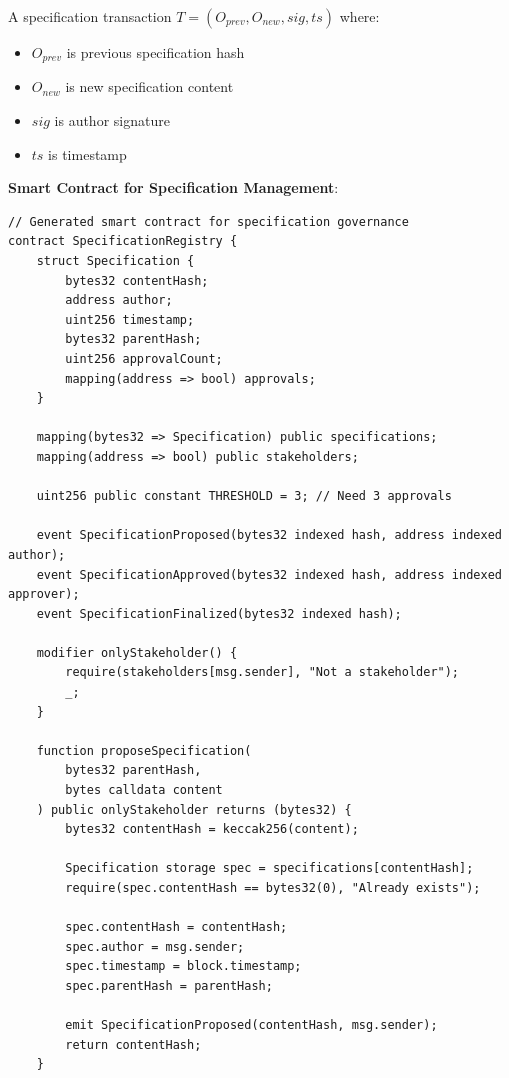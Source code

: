 \begin{definition}
    A specification transaction $T = (O_{prev}, O_{new}, sig, ts)$ where:
    \begin{itemize}
        \item $O_{prev}$ is previous specification hash
        \item $O_{new}$ is new specification content
        \item $sig$ is author signature
        \item $ts$ is timestamp
    \end{itemize}
\end{definition}

\textbf{Smart Contract for Specification Management}:

\begin{verbatim}
// Generated smart contract for specification governance
contract SpecificationRegistry {
    struct Specification {
        bytes32 contentHash;
        address author;
        uint256 timestamp;
        bytes32 parentHash;
        uint256 approvalCount;
        mapping(address => bool) approvals;
    }

    mapping(bytes32 => Specification) public specifications;
    mapping(address => bool) public stakeholders;

    uint256 public constant THRESHOLD = 3; // Need 3 approvals

    event SpecificationProposed(bytes32 indexed hash, address indexed author);
    event SpecificationApproved(bytes32 indexed hash, address indexed approver);
    event SpecificationFinalized(bytes32 indexed hash);

    modifier onlyStakeholder() {
        require(stakeholders[msg.sender], "Not a stakeholder");
        _;
    }

    function proposeSpecification(
        bytes32 parentHash,
        bytes calldata content
    ) public onlyStakeholder returns (bytes32) {
        bytes32 contentHash = keccak256(content);

        Specification storage spec = specifications[contentHash];
        require(spec.contentHash == bytes32(0), "Already exists");

        spec.contentHash = contentHash;
        spec.author = msg.sender;
        spec.timestamp = block.timestamp;
        spec.parentHash = parentHash;

        emit SpecificationProposed(contentHash, msg.sender);
        return contentHash;
    }


\end{verbatim}
